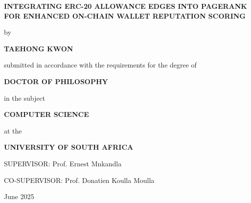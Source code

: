\begin{titlepage}
\centering
\vspace*{0.4cm}
{\Large\bfseries INTEGRATING ERC-20 ALLOWANCE EDGES INTO PAGERANK FOR ENHANCED ON-CHAIN WALLET REPUTATION SCORING\par}
\vfill
{by\par}
\vspace{0.7cm}
{\large\bfseries TAEHONG KWON\par}
\vfill
{submitted in accordance with the requirements for the degree of\par}
\vspace{0.7cm}
{\large\bfseries DOCTOR OF PHILOSOPHY\par}
\vspace{0.35cm}
{in the subject\par}
\vspace{0.7cm}
{\large\bfseries COMPUTER SCIENCE\par}
\vfill
{at the\par}
\vspace{0.7cm}
{\large\bfseries UNIVERSITY OF SOUTH AFRICA\par}
\vfill
{SUPERVISOR: Prof. Ernest Mnkandla\par}
\vspace{0.35cm}
{CO-SUPERVISOR: Prof. Donatien Koulla Moulla\par}
\vfill
{June 2025\par}
\end{titlepage}
\restoregeometry
